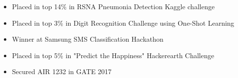\documentclass[10pt,a4paper,ragged2e]{altacv}
\begin{document}

\smallskip
\begin{itemize}
\item Placed in top 14\% in RSNA Pneumonia Detection Kaggle challenge
\smallskip
\item Placed in top 3\% in Digit Recognition Challenge using One-Shot Learning
\smallskip
\item Winner at Samsung SMS Classification Hackathon
\smallskip
\item Placed in top 5\% in "Predict the Happiness" Hackerearth Challenge
\smallskip
\item Secured AIR 1232 in GATE 2017
\end{itemize}





{}




\end{document}
